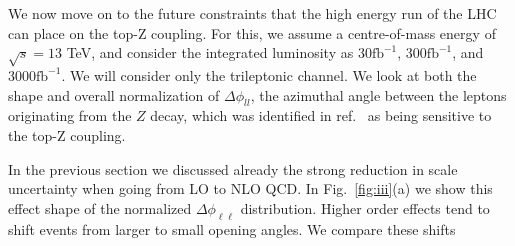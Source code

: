 \documentclass[preprint]{JHEP3} %
\def\Dphill{\Delta \phi_{ll}}
\def\invfb {\mathrm{fb}^{-1}}
\begin{document}
We now move on to the future constraints that the high energy run of the LHC can place on the top-Z coupling. 
For this, we assume a centre-of-mass energy of $\sqrt{s}=13$ TeV, and consider the integrated luminosity as $30 \invfb$, $300 \invfb$, and $3000 \invfb$. 
We will consider only the trileptonic channel. 
We look at both the shape and overall normalization of $\Dphill$, the azimuthal angle between the leptons originating from the $Z$ decay, which was identified in ref.~\cite{baur} as being sensitive to the top-Z coupling.

In the previous section we discussed already the strong reduction in scale uncertainty when going from LO to NLO QCD.
In Fig.~\ref{fig:iii}(a) we show this effect shape of the normalized $\Delta \phi_{\ell\ell}$ distribution. 
Higher order effects tend to shift events from larger to small opening angles.
We compare these shifts 
\end{document}
